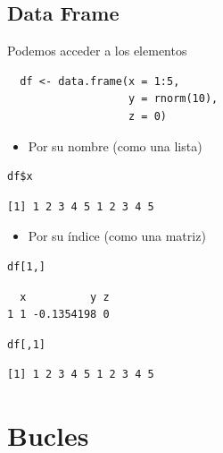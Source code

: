 \documentclass[xcolor={usenames,svgnames,dvipsnames}]{beamer}
\begin{document}
\subsection{Data Frame}
\label{sec-3-5}
\begin{frame}[fragile,label=sec-3-5-1]{Podemos acceder a los elementos}
 \lstset{language=R,label= ,caption= ,numbers=none}
\begin{lstlisting}
  df <- data.frame(x = 1:5,
                   y = rnorm(10),
                   z = 0)
\end{lstlisting}

\begin{itemize}
\item Por su nombre (como una lista)
\end{itemize}
\lstset{language=R,label= ,caption= ,numbers=none}
\begin{lstlisting}
df$x
\end{lstlisting}

\begin{verbatim}
[1] 1 2 3 4 5 1 2 3 4 5
\end{verbatim}

\begin{itemize}
\item Por su índice (como una matriz)
\end{itemize}
\lstset{language=R,label= ,caption= ,numbers=none}
\begin{lstlisting}
df[1,]
\end{lstlisting}

\begin{verbatim}
  x          y z
1 1 -0.1354198 0
\end{verbatim}

\lstset{language=R,label= ,caption= ,numbers=none}
\begin{lstlisting}
df[,1]
\end{lstlisting}

\begin{verbatim}
[1] 1 2 3 4 5 1 2 3 4 5
\end{verbatim}
\end{frame}

\section{Bucles}
\label{sec-4}
\end{document}

